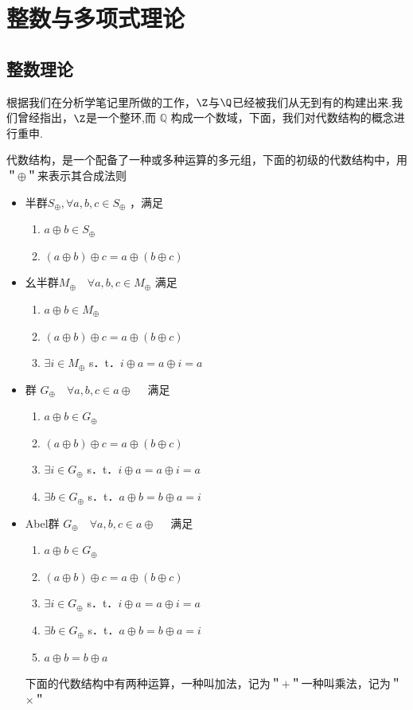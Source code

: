 \setchapterintro{}
\chapter{整数与多项式理论}
\section{整数理论}
根据我们在分析学笔记里所做的工作，$\Z$与$\Q$已经被我们从无到有的构建出来.我们曾经指出，$\Z$是一个整环,而 $\mathbb{Q}$ 构成一个数域，下面，我们对代数结构的概念进行重申.
\begin{definition}\label{p1:concept:c1-l7}
	代数结构，是一个配备了一种或多种运算的多元组，下面的初级的代数结构中，用＂$\oplus$＂来表示其合成法则
	\begin{itemize}
		\item 半群$S _\oplus, \forall a, b,c \in S _\oplus$ ，满足
		\begin{enumerate}
			\item$a \oplus b \in S _\oplus$
			\item$(a \oplus b) \oplus c=a \oplus(b \oplus c)$
		\end{enumerate}
		\item 幺半群$M _\oplus \quad \forall a, b,c \in M _\oplus$ 满足
		\begin{enumerate}
			\item $a \oplus b \in M _\oplus$
			\item$(a \oplus b) \oplus c=a \oplus(b \oplus c)$
			\item$\exists i \in M _\oplus$ s．t．$i \oplus a=a \oplus i=a$
		\end{enumerate}
		\item 群 $G_ \oplus \quad \forall a, b, c \in a \oplus \quad$ 满足
		\begin{enumerate}
			\item $a \oplus b \in G _\oplus$
			\item$(a \oplus b) \oplus c=a \oplus(b \oplus c)$
			\item$\exists i \in G _\oplus$ s．t．$i \oplus a=a \oplus i=a$
			\item $\exists b \in G _\oplus$ s．t．$a \oplus b=b \oplus a=i$
		\end{enumerate}
		\item Abel群 $G_ \oplus \quad \forall a, b, c \in a \oplus \quad$ 满足
		\begin{enumerate}
			\item $a \oplus b \in G _\oplus$
			\item$(a \oplus b) \oplus c=a \oplus(b \oplus c)$
			\item$\exists i \in G _\oplus$ s．t．$i \oplus a=a \oplus i=a$
			\item $\exists b \in G _\oplus$ s．t．$a \oplus b=b \oplus a=i$
			\item $a\oplus b=b\oplus a$
		\end{enumerate}
		下面的代数结构中有两种运算，一种叫加法，记为＂$+$＂一种叫乘法，记为＂$\times$＂
		

\end{itemize}
\end{definition}
